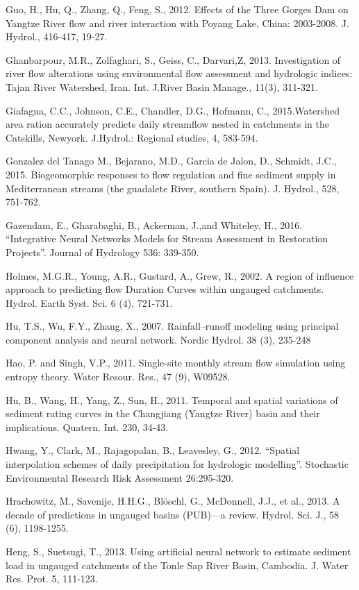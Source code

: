 \begin{hangingpar}{2em}
Guo, H., Hu, Q., Zhang, Q., Feng, S., 2012. Effects of the Three Gorges Dam on Yangtze River flow and river interaction with Poyang Lake, China: 2003-2008. J. Hydrol., 416-417, 19-27.

Ghanbarpour, M.R., Zolfaghari, S., Geiss, C., Darvari,Z, 2013. Investigation of river flow alterations using environmental flow assessment and hydrologic indices: Tajan River Watershed, Iran. Int. J.River Basin Manage., 11(3), 311-321.

Giafagna, C.C., Johnson, C.E., Chandler, D.G., Hofmann, C., 2015.Watershed area ration accurately predicts daily streamflow nested in catchments in the Catskills, Newyork. J.Hydrol.: Regional studies, 4, 583-594.

Gonzalez del Tanago M., Bejarano, M.D., Garcia de Jalon, D., Schmidt, J.C., 2015. Biogeomorphic responses to flow regulation and fine sediment supply in Mediterranean streams (the guadalete River, southern Spain). J. Hydrol., 528, 751-762. 

Gazendam, E., Gharabaghi, B., Ackerman, J.,and Whiteley, H., 2016.  ``Integrative Neural Networks Models for Stream Assessment in Restoration Projects''.  Journal of Hydrology 536: 339-350. 

Holmes, M.G.R., Young, A.R., Gustard, A., Grew, R., 2002. A region of influence approach to predicting flow Duration Curves within ungauged catchments. Hydrol. Earth Syst. Sci. 6 (4), 721-731.

Hu, T.S., Wu, F.Y., Zhang, X., 2007. Rainfall–runoff modeling using principal component analysis and neural network. Nordic Hydrol. 38 (3), 235-248

Hao, P. and Singh, V.P., 2011. Single-site monthly stream flow simulation using entropy theory. Water Resour. Res., 47 (9), W09528.

Hu, B., Wang, H., Yang, Z., Sun, H., 2011. Temporal and spatial variations of sediment rating curves in the Changjiang (Yangtze River) basin and their implications. Quatern. Int. 230, 34-43.

Hwang, Y., Clark, M., Rajagopalan, B.,  Leavesley, G., 2012. ``Spatial interpolation schemes of daily precipitation for hydrologic modelling''. Stochastic Environmental Research Risk Assessment 26:295-320.

Hrachowitz, M., Savenije, H.H.G., Blöschl, G., McDonnell, J.J., et al., 2013. A decade of predictions in ungauged basins (PUB)—a review. Hydrol. Sci. J., 58 (6), 1198-1255.

Heng, S., Suetsugi, T., 2013. Using artificial neural network to estimate sediment  load in ungauged catchments of the Tonle Sap River Basin, Cambodia. J. Water Res. Prot. 5, 111-123.


\end{hangingpar}
